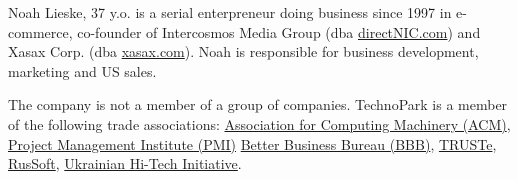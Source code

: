 Noah Lieske, 37 y.o.
is a serial enterpreneur doing business since 1997 in 
e-commerce, co-founder of Intercosmos Media Group (dba \href{http://www.directnic.com}{directNIC.com}) and 
Xasax Corp. (dba \href{http://www.xasax.com}{xasax.com}). Noah is responsible
for business development, marketing and US sales.

The company is not a member of a group of companies.
TechnoPark is a member of the following trade associations:
    \href{http://www.acm.org}{Association for Computing Machinery (ACM)},
    \href{http://www.pmi.org}{Project Management Institute (PMI)}
	\href{https://www.bbb.org/online/consumer/cks.aspx?ID=10805219819}{Better Business Bureau (BBB)},
	\href{http://www.truste.org/ivalidate.php?url=www.technoparkcorp.com&amp;sealid=101}{TRUSTe},
	\href{http://www.russoft.org}{RusSoft},
	\href{http://hi-tech.org.ua/Russian/about/members/index.html}{Ukrainian Hi-Tech Initiative}.
